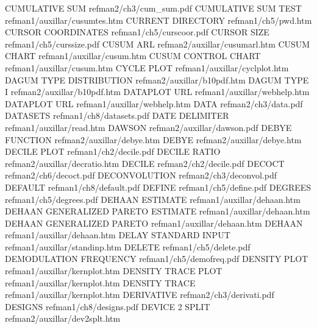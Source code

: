 CUMULATIVE SUM                          refman2/ch3/cum_sum.pdf
CUMULATIVE SUM TEST                     refman1/auxillar/cusumtes.htm
CURRENT DIRECTORY                       refman1/ch5/pwd.htm
CURSOR COORDINATES                      refman1/ch5/curscoor.pdf
CURSOR SIZE                             refman1/ch5/curssize.pdf
CUSUM ARL                               refman2/auxillar/cusumarl.htm
CUSUM CHART                             refman1/auxillar/cusum.htm
CUSUM CONTROL CHART                     refman1/auxillar/cusum.htm
CYCLE PLOT                              refman1/auxillar/cyclplot.htm
DAGUM TYPE DISTRIBUTION                 refman2/auxillar/b10pdf.htm
DAGUM TYPE I                            refman2/auxillar/b10pdf.htm
DATAPLOT URL                            refman1/auxillar/webhelp.htm
DATAPLOT URL                            refman1/auxillar/webhelp.htm
DATA                                    refman2/ch3/data.pdf
DATASETS                                refman1/ch8/datasets.pdf
DATE DELIMITER                          refman1/auxillar/read.htm
DAWSON                                  refman2/auxillar/dawson.pdf
DEBYE FUNCTION                          refman2/auxillar/debye.htm
DEBYE                                   refman2/auxillar/debye.htm
DECILE PLOT                             refman1/ch2/decile.pdf
DECILE RATIO                            refman2/auxillar/decratio.htm
DECILE                                  refman2/ch2/decile.pdf
DECOCT                                  refman2/ch6/decoct.pdf
DECONVOLUTION                           refman2/ch3/deconvol.pdf
DEFAULT                                 refman1/ch8/default.pdf
DEFINE                                  refman1/ch5/define.pdf
DEGREES                                 refman1/ch5/degrees.pdf
DEHAAN ESTIMATE                         refman1/auxillar/dehaan.htm
DEHAAN GENERALIZED PARETO  ESTIMATE     refman1/auxillar/dehaan.htm
DEHAAN GENERALIZED PARETO               refman1/auxillar/dehaan.htm
DEHAAN                                  refman1/auxillar/dehaan.htm
DELAY STANDARD INPUT                    refman1/auxillar/standinp.htm
DELETE                                  refman1/ch5/delete.pdf
DEMODULATION FREQUENCY                  refman1/ch5/demofreq.pdf
DENSITY PLOT                            refman1/auxillar/kernplot.htm
DENSITY TRACE PLOT                      refman1/auxillar/kernplot.htm
DENSITY TRACE                           refman1/auxillar/kernplot.htm
DERIVATIVE                              refman2/ch3/derivati.pdf
DESIGNS                                 refman1/ch8/designs.pdf
DEVICE 2 SPLIT                          refman2/auxillar/dev2splt.htm
